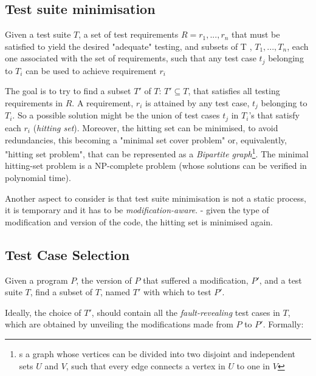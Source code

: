 \subsection{Test suite minimisation}


\theoremstyle{definition}
\begin{definition}{}
	Given a test suite $T$, a set of test requirements $ R = {r_1, ..., r_n}$ that must be satisfied to yield the desired "adequate" testing, and subsets of T ,  ${T_1, ..., T_n}$, each one associated with the set of requirements, such that any test case $t_j$ belonging to $T_i$ can be used to achieve requirement $r_i$
\end{definition}

The goal is to try to find a subset $T'$ of $T$: $T' \subseteq T$, that satisfies all testing requirements in $R$. A requirement, $r_i$ is attained by any test case, $t_j$ belonging to $T_i$. So a possible solution might be the union of test cases $t_j$ in $T_i$'s that satisfy each $r_i$ (\textit{hitting set}). Moreover, the hitting set can be minimised, to avoid redundancies, this becoming a "minimal set cover problem" or, equivalently, "hitting set problem", that can be represented as a \textit{Bipartite graph}\footnote{s a graph whose vertices can be divided into two disjoint and independent sets $U$ and $V$, such that every edge connects a vertex in $U$ to one in $V$\cite{NPcomplete}}. The minimal hitting-set problem is a NP-complete problem (whose solutions can be verified in polynomial time). \cite{NPcomplete} 

Another aspect to consider is that test suite minimisation is not a static process, it is temporary and  it has to be \textit{modification-aware}. - given the type of modification and version of the code, the hitting set is minimised again. \cite{ShinThesis}

\subsection{Test Case Selection}


\theoremstyle{definition}
\begin{definition}{}
	Given a program $P$, the version of $P$ that suffered a modification, $P'$, and a test suite $T$, find a subset of $T$, named $T'$ with which to test $P'$.
\end{definition}

Ideally, the choice of $T'$, should contain all the \textit{fault-revealing} test cases in $T$, which are obtained by unveiling the modifications made from $P$ to $P'$. Formally: 

